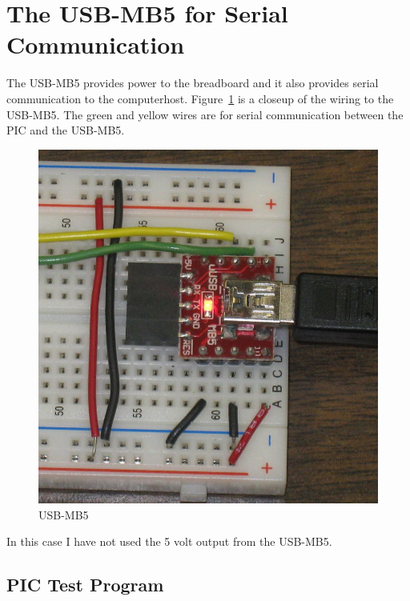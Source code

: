 \documentclass[twocolumn]{article}
\makeatletter
\def\maxwidth{\ifdim\Gin@nat@width>\linewidth\linewidth
\else\Gin@nat@width\fi}
\let\Oldincludegraphics\includegraphics
\renewcommand{\includegraphics}[1]{\Oldincludegraphics[width=\maxwidth]{#1}}
\makeatother
\begin{document}
\section{The USB-MB5 for Serial Communication}

The USB-MB5 provides power to the breadboard and it also provides serial communication to the computerhost. Figure~\ref{usbmb5} is a closeup of the wiring to the USB-MB5. The green and yellow wires are for serial communication between the PIC and the USB-MB5.

\begin{figure}[htbp]
\centering
\includegraphics{phys1600/usb-mb5.jpg}
\caption{USB-MB5}
\label{usbmb5}
\end{figure}

In this case I have not used the 5 volt output from the USB-MB5.

\subsection{PIC Test Program}
\end{document}

